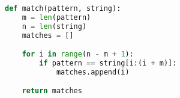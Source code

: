 \begin{lstlisting}[language=Python,caption={Python naive implementation},label={lst:naive_python}]
def match(pattern, string):
    m = len(pattern)
    n = len(string)
    matches = []

    for i in range(n - m + 1):
        if pattern == string[i:(i + m)]:
            matches.append(i)

    return matches
\end{lstlisting}
